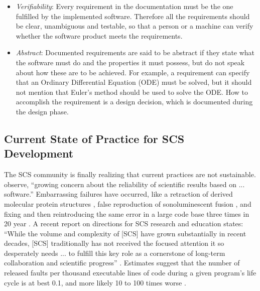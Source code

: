 \documentclass[12pt]{article}
\begin{document}
\begin{itemize}
\item \emph{Verifiability}: Every requirement in the documentation must be the
  one fulfilled by the implemented software. Therefore all the requirements
  should be clear, unambiguous and testable, so that a person or a machine can
  verify whether the software product meets the requirements.

\item \emph{Abstract}: Documented requirements are said to be abstract if they
  state what the software must do and the properties it must possess, but do not
  speak about how these are to be achieved. For example, a requirement can
  specify that an Ordinary Differential Equation (ODE) must be solved, but it
  should not mention that Euler's method should be used to solve the ODE. How to
  accomplish the requirement is a design decision, which is documented during
  the design phase.

\end{itemize}

\subsection{Current State of Practice for SCS Development}

The SCS community is finally realizing that current practices are not
sustainable.  \citet{FaulkEtAl2009} observe, ``growing concern about the
reliability of scientific results based on ... software.''  Embarrassing
failures have occurred, like a retraction of derived molecular protein
structures \citep{Miller2006}, false reproduction of sonoluminescent fusion
\citep{PostAndVotta2005}, and fixing and then reintroducing the same error in a
large code base three times in 20 year \citep{MilewiczAndRaybourn2018}.  A
recent report on directions for SCS research and education states: ``While the
volume and complexity of [SCS] have grown substantially in recent decades, [SCS]
traditionally has not received the focused attention it so desperately needs
... to fulfill this key role as a cornerstone of long-term collaboration and
scientific progress'' \citep{RudeEtAl2018}.  Estimates suggest that the number
of released faults per thousand executable lines of code during a given
program’s life cycle is at best 0.1, and more likely 10 to 100 times worse
\citep{Hatton2007}.
\end{document}
